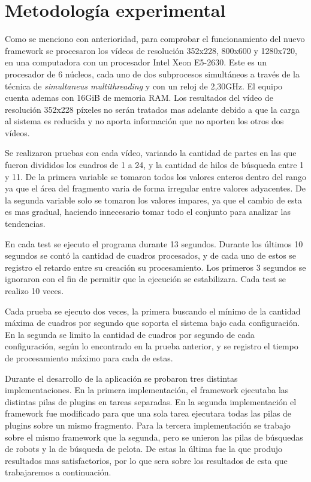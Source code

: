 
\section{Metodología experimental}

Como se menciono con anterioridad, para comprobar el funcionamiento del nuevo
framework se procesaron los vídeos de resolución 352x228, 800x600 y 1280x720, en
una computadora con un procesador Intel Xeon E5-2630. Este es un procesador de 6
núcleos, cada uno de dos subprocesos simultáneos a través de la técnica de
\emph{simultaneus multithreading} y con un reloj de 2,30GHz. El equipo cuenta
ademas con 16GiB de memoria RAM. Los resultados del vídeo de resolución 352x228
píxeles no serán tratados mas adelante debido a que la carga al sistema es
reducida y no aporta información que no aporten los otros dos vídeos.

Se realizaron pruebas con cada vídeo, variando la cantidad de partes en las que
fueron divididos los cuadros de 1 a 24, y la cantidad de hilos de búsqueda entre
1 y 11. De la primera variable se tomaron todos los valores enteros dentro del
rango ya que el área del fragmento varia de forma irregular entre valores
adyacentes. De la segunda variable solo se tomaron los valores impares, ya que
el cambio de esta es mas gradual, haciendo innecesario tomar todo el conjunto
para analizar las tendencias.

En cada test se ejecuto el programa durante 13 segundos. Durante los últimos 10
segundos se contó la cantidad de cuadros procesados, y de cada uno de estos se
registro el retardo entre su creación su procesamiento. Los primeros 3 segundos
se ignoraron con el fin de permitir que la ejecución se estabilizara. Cada test
se realizo 10 veces.

Cada prueba se ejecuto dos veces, la primera buscando el mínimo de la cantidad
máxima de cuadros por segundo que soporta el sistema bajo cada configuración. En
la segunda se limito la cantidad de cuadros por segundo de cada configuración,
según lo encontrado en la prueba anterior, y se registro el tiempo de
procesamiento máximo para cada de estas.

Durante el desarrollo de la aplicación se probaron tres distintas
implementaciones. En la primera implementación, el framework ejecutaba las
distintas pilas de plugins en tareas separadas. En la segunda implementación el
framework fue modificado para que una sola tarea ejecutara todas las pilas de
plugins sobre un mismo fragmento. Para la tercera implementación se trabajo
sobre el mismo framework que la segunda, pero se unieron las pilas de búsquedas
de robots y la de búsqueda de pelota. De estas la última fue la que produjo
resultados mas satisfactorios, por lo que sera sobre los resultados de esta que
trabajaremos a continuación.

